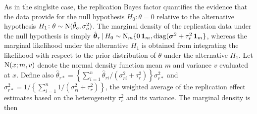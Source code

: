 \documentclass[a4paper, 11pt]{article}
\begin{document}
As in the singlsite case, the replication Bayes factor quantifies the evidence
that the data provide for the null hypothesis $H_{0}\colon \theta = 0$ relative
to the alternative hypothesis
$H_{1} \colon \theta \sim \operatorname{N}(\hat{\theta}_{o}, \sigma^{2}_{o})$. The marginal density
of the replication data under the null hypothesis is simply
$\hat{\boldsymbol{\theta}}_{r} \,\vert\, H_{0} \sim \operatorname{N}_{m}\{0 \, \mathbf{1}_{m}, \operatorname{diag}(\boldsymbol{\sigma}^{2} + \tau^{2}_{r} \, \mathbf{1}_{m}\}$,
whereas the marginal likelihood under the alternative $H_{1}$ is obtained from
integrating the likelihood
with respect to the prior distribution of $\theta$ under the alternative
$H_{1}$. %
Let $\operatorname{N}(x;m,v)$ denote the normal density function mean $m$ and variance $v$
evaluated at $x$. Define also
$\hat{\theta}_{r*} = \left\{\sum_{i=1}^{n}\hat{\theta}_{ri}/(\sigma^{2}_{ri} + \tau^{2}_{r})\right\} \sigma^{2}_{r*}$
and
$\sigma^{2}_{r*} = 1/\left\{\sum_{i=1}^{n}1/(\sigma^{2}_{ri} + \tau^{2}_{r})\right\}$,
\ie{} the weighted average of the replication effect estimates based on the
heterogeneity $\tau^{2}_{r}$ and its variance. The marginal density is then
\end{document}
